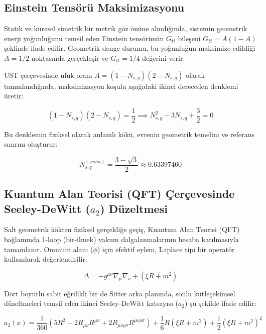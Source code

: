 \documentclass[12pt,a4paper]{article}
\begin{document}
\subsection{Einstein Tensörü Maksimizasyonu}
Statik ve küresel simetrik bir metrik göz önüne alındığında, sistemin geometrik enerji yoğunluğunu temsil eden Einstein tensörünün $G_{tt}$ bileşeni $G_{tt} = A(1 - A)$ şeklinde ifade edilir. Geometrik denge durumu, bu yoğunluğun maksimize edildiği $A = 1/2$ noktasında gerçekleşir ve $G_{tt} = 1/4$ değerini verir.

UST çerçevesinde ufuk oranı $A = (1 - N_{s,q})(2 - N_{s,q})$ olarak tanımlandığında, maksimizasyon koşulu aşağıdaki ikinci dereceden denklemi üretir:

\begin{equation}
(1 - N_{s,q})(2 - N_{s,q}) = \frac{1}{2} \implies N_{s,q}^2 - 3N_{s,q} + \frac{3}{2} = 0
\end{equation}

Bu denklemin fiziksel olarak anlamlı kökü, evrenin geometrik temelini ve referans sınırını oluşturur:

\begin{equation}
N_{s,q}^{(geom)} = \frac{3 - \sqrt{3}}{2} \approx 0.63397460
\end{equation}

\subsection{Kuantum Alan Teorisi (QFT) Çerçevesinde Seeley-DeWitt ($a_2$) Düzeltmesi}
Salt geometrik kökten fiziksel gerçekliğe geçiş, Kuantum Alan Teorisi (QFT) bağlamında 1-loop (bir-ilmek) vakum dalgalanmalarının hesaba katılmasıyla tamamlanır. Omnium alanı ($\phi$) için efektif eylem, Laplace tipi bir operatör kullanılarak değerlendirilir:

\begin{equation}
\Delta = -g^{\mu\nu}\nabla_\mu\nabla_\nu + (\xi R + m^2)
\end{equation}

Dört boyutlu sabit eğrilikli bir de Sitter arka planında, sonlu kütleçekimsel düzeltmeleri temsil eden ikinci Seeley-DeWitt katsayısı ($a_2$) şu şekilde ifade edilir:

\begin{equation}
a_2(x) = \frac{1}{360}(5R^2 - 2R_{\mu\nu}R^{\mu\nu} + 2R_{\mu\nu\rho\sigma}R^{\mu\nu\rho\sigma}) + \frac{1}{6}R(\xi R + m^2) + \frac{1}{2}(\xi R + m^2)^2
\end{equation}
\end{document}
